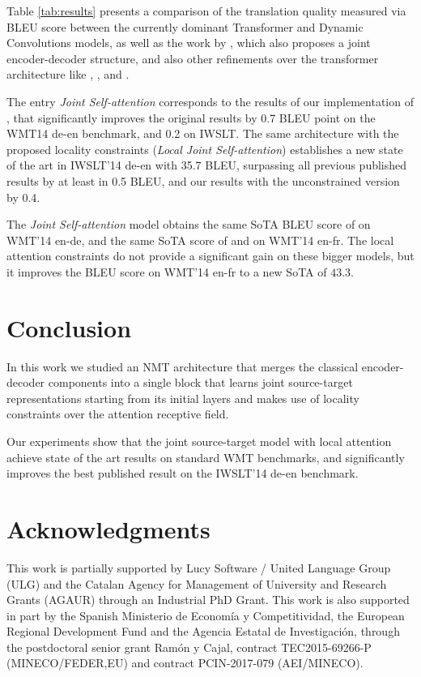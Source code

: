 \documentclass[11pt,a4paper]{article}
\begin{document}
Table \ref{tab:results} presents a comparison of
the translation quality measured via BLEU score between
the currently dominant Transformer \cite{vaswani2017transformer}
and Dynamic Convolutions \cite{wu2018dynconv} models,
as well as the work by , which
also proposes a joint encoder-decoder structure, and
also other refinements over the transformer architecture
like
\cite{ahmed2018weighted},
\cite{chen2018combining},
\cite{shaw2018relative}
and \cite{ott2018scaling} .

The entry \textit{Joint Self-attention} corresponds to the results 
of our implementation of \cite{he2018layerwise}, that significantly improves
the original results by 0.7 BLEU point on the WMT14 de-en benchmark, and 0.2 on IWSLT.
The same architecture with the proposed locality constraints (\textit{Local Joint Self-attention}) 
establishes a new state of the art in IWSLT'14 de-en with 35.7 BLEU,
surpassing all previous published results by at least in 0.5 BLEU, and our results with 
the unconstrained version by 0.4. 

The \textit{Joint Self-attention} model obtains the same SoTA BLEU score of \cite{wu2018dynconv} on WMT'14 en-de, and the same SoTA score of \cite{ott2018scaling} and \cite{wu2018dynconv} on WMT'14 en-fr. The local attention constraints do not provide a significant gain on these bigger models, but it improves the BLEU score on WMT'14 en-fr to a new SoTA of $43.3$.

\section{Conclusion} \label{sec:conclusion}

In this work we studied an NMT architecture that merges the
classical encoder-decoder components into a single block
that learns joint source-target representations starting from its
initial layers and makes use of locality constraints over
the attention receptive field.

Our experiments show that the joint source-target model
with local attention achieve state of the art results on
standard WMT benchmarks, and significantly improves the 
best published result on the IWSLT'14 de-en benchmark.


\ifaclfinal
\section*{Acknowledgments}

This work is partially supported by Lucy Software / United Language Group (ULG)
and the Catalan Agency for Management of University and Research Grants (AGAUR)
through an Industrial PhD Grant.
This work is also supported in part by the
Spanish Ministerio de Economía y Competitividad,
the European Regional Development Fund
and the Agencia Estatal de Investigación,
through the postdoctoral senior grant Ramón y Cajal, contract TEC2015-69266-P
(MINECO/FEDER,EU) and contract PCIN-2017-079 (AEI/MINECO).

\fi





\end{document}

